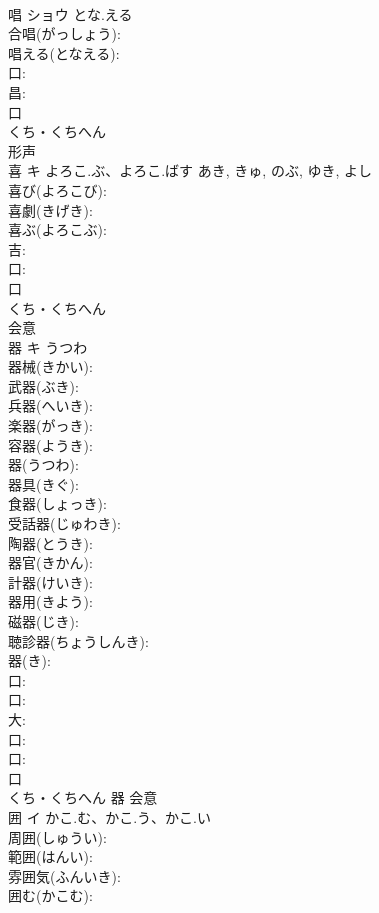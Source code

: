 \documentclass[8pt]{extreport}
\begin{document}
\begin{CJK}{UTF8}{min}
\\	唱	ショウ	とな.える		
\\	合唱(がっしょう): 
\\	唱える(となえる): 
\\	口: 
\\	昌: 
\\	口	
\\	くち・くちへん	
\\	形声 
\\	喜	キ	よろこ.ぶ、よろこ.ばす	あき, きゅ, のぶ, ゆき, よし	
\\	喜び(よろこび): 
\\	喜劇(きげき): 
\\	喜ぶ(よろこぶ): 
\\	吉: 
\\	口: 
\\	口	
\\	くち・くちへん	
\\	会意 
\\	器	キ	うつわ		
\\	器械(きかい): 
\\	武器(ぶき): 
\\	兵器(へいき): 
\\	楽器(がっき): 
\\	容器(ようき): 
\\	器(うつわ): 
\\	器具(きぐ): 
\\	食器(しょっき): 
\\	受話器(じゅわき): 
\\	陶器(とうき): 
\\	器官(きかん): 
\\	計器(けいき): 
\\	器用(きよう): 
\\	磁器(じき): 
\\	聴診器(ちょうしんき): 
\\	器(き): 
\\	口: 
\\	口: 
\\	大: 
\\	口: 
\\	口: 
\\	口	
\\	くち・くちへん	器	会意 
\\	囲	イ	かこ.む、かこ.う、かこ.い		
\\	周囲(しゅうい): 
\\	範囲(はんい): 
\\	雰囲気(ふんいき): 
\\	囲む(かこむ): 

\end{CJK}
\end{document}
